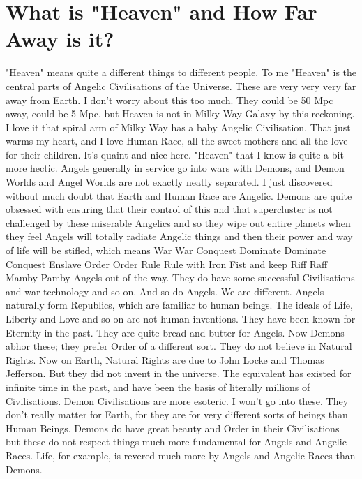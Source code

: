 \documentclass{amsart}
\begin{document}
\section{What is "Heaven" and How Far Away is it?}

"Heaven" means quite a different things to different people.  To me "Heaven" is the central parts of Angelic Civilisations of the Universe.  These are very very very far away from Earth.  I don't worry about this too much.  They could be 50 Mpc away, could be 5 Mpc, but Heaven is not in Milky Way Galaxy by this reckoning.  I love it that spiral arm of Milky Way has a baby Angelic Civilisation.  That just warms my heart, and I love Human Race, all the sweet mothers and all the love for their children.  It's quaint and nice here.  "Heaven" that I know is quite a bit more hectic.  Angels generally in service go into wars with Demons, and Demon Worlds and Angel Worlds are not exactly neatly separated.  I just discovered without much doubt that Earth and Human Race are Angelic.  Demons are quite obsessed with ensuring that their control of this and that supercluster is not challenged by these miserable Angelics and so they wipe out entire planets when they feel Angels will totally radiate Angelic things and then their power and way of life will be stifled, which means War War Conquest Dominate Dominate Conquest Enslave Order Order Rule Rule with Iron Fist and keep Riff Raff Mamby Pamby Angels out of the way.  They do have some successful Civilisations and war technology and so on.  And so do Angels.  We are different.  Angels naturally form Republics, which are familiar to human beings.  The ideals of Life, Liberty and Love and so on are not human inventions.  They have been known for Eternity in the past.  They are quite bread and butter for Angels.  Now Demons abhor these; they prefer Order of a different sort.  They do not believe in Natural Rights.  Now on Earth, Natural Rights are due to John Locke and Thomas Jefferson.  But they did not invent in the universe.  The equivalent has existed for infinite time in the past, and have been the basis of literally millions of Civilisations.  Demon Civilisations are more esoteric. I won't go into these.  They don't really matter for Earth, for they are for very different sorts of beings than Human Beings.  Demons do have great beauty and Order in their Civilisations but these do not respect things much more fundamental for Angels and Angelic Races.  Life, for example, is revered much more by Angels and Angelic Races than Demons.  
\end{document}
